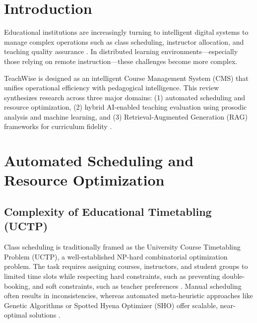 


\section{Introduction}
Educational institutions are increasingly turning to intelligent digital systems to manage complex operations such as class scheduling, instructor allocation, and teaching quality assurance \cite{Lv2025, Almubarak2025}. In distributed learning environments—especially those relying on remote instruction—these challenges become more complex.

TeachWise is designed as an intelligent Course Management System (CMS) that unifies operational efficiency with pedagogical intelligence. This review synthesizes research across three major domains: (1) automated scheduling and resource optimization, (2) hybrid AI-enabled teaching evaluation using prosodic analysis and machine learning, and (3) Retrieval-Augmented Generation (RAG) frameworks for curriculum fidelity \cite{Donnelly2016, Gao2024}.

\section{Automated Scheduling and Resource Optimization}
\subsection{Complexity of Educational Timetabling (UCTP)}
Class scheduling is traditionally framed as the University Course Timetabling Problem (UCTP), a well-established NP-hard combinatorial optimization problem. The task requires assigning courses, instructors, and student groups to limited time slots while respecting hard constraints, such as preventing double-booking, and soft constraints, such as teacher preferences \cite{Sahargahi2021}. Manual scheduling often results in inconsistencies, whereas automated meta-heuristic approaches like Genetic Algorithms or Spotted Hyena Optimizer (SHO) offer scalable, near-optimal solutions \cite{Nguyen2021, Diallo2024}.

